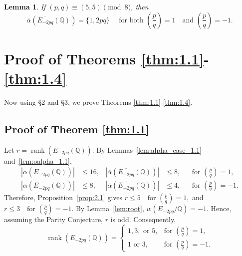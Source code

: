 \documentclass[12pt]{amsart}
\newcommand{\bbQ}{\mathbb{Q}}
\newcommand{\legendre}[2]{\genfrac{(}{)}{}{}{#1}{#2}}
\DeclareMathOperator{\rank}{rank}
\numberwithin{equation}{section}
\newtheorem{lem}{Lemma}[section]
\theoremstyle{definition}
\begin{document}
\begin{lem}
\label{lem:oalpha_4.4}
If $(p,q)\equiv (5,5)\pmod 8$, then
\[
\overline{\alpha}\left(\overline{E_{-2pq}}(\bbQ)\right)
= \{1,2pq\} \quad \text{ for both } \legendre{p}{q}=1 \quad \text{and } \legendre{p}{q}=-1.
\]
\end{lem}



\section{Proof of Theorems \ref{thm:1.1}-\ref{thm:1.4}}

Now using \S 2 and  \S 3, we prove Theorems \ref{thm:1.1}-\ref{thm:1.4}.

\subsection*{Proof of Theorem \ref{thm:1.1}}
Let $r=\rank(E_{-2pq}(\bbQ))$. By Lemmas~\ref{lem:alpha_case_1.1}
and~\ref{lem:oalpha_1.1},
\[
\begin{aligned}
|\alpha(E_{-2pq}(\bbQ))|&\leq16,
&\left|\overline{\alpha}\left(\overline{E_{-2pq}}(\bbQ)\right)\right|&\leq8,
&&\text{for }\legendre{p}{q}=1,\\
|\alpha(E_{-2pq}(\bbQ))|&\leq8,
&\left|\overline{\alpha}\left(\overline{E_{-2pq}}(\bbQ)\right)\right|&\leq4,
&&\text{for }\legendre{p}{q}=-1.
\end{aligned}
\]
Therefore, Proposition~\ref{prop:2.1} gives
$ \displaystyle
r\leq5 \quad\text{for }\legendre{p}{q}=1,$ and $ \displaystyle r\leq3 \quad\text{for }\legendre{p}{q}=-1.
$
By Lemma~\ref{lem:root}, $w(E_{-2pq}/\bbQ)=-1$. Hence, assuming the
Parity Conjecture, $r$ is odd. Consequently,
\[
\rank(E_{-2pq}(\bbQ))=
\begin{cases}
1,3,\text{ or }5, & \text{for }\legendre{p}{q}=1,\\
1\text{ or }3, & \text{for }\legendre{p}{q}=-1.
\end{cases}
\]
\end{document}
